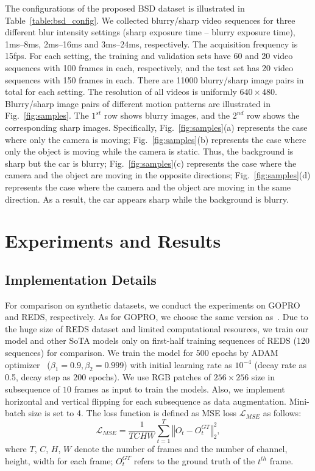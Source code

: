 \documentclass[twocolumn]{svjour3}          \smartqed  \usepackage{graphicx}
\begin{document}
The configurations of the proposed BSD dataset is illustrated in Table~\ref{table:bsd_config}. We collected blurry/sharp video sequences for three different blur intensity settings (sharp exposure time -- blurry exposure time), 1ms--8ms, 2ms--16ms and 3ms--24ms, respectively. The acquisition frequency is 15fps. For each setting, the training and validation sets have 60 and 20 video sequences with 100 frames in each, respectively, and the test set has 20 video sequences with 150 frames in each. There are 11000 blurry/sharp image pairs in total for each setting. The resolution of all videos is uniformly $640\times480$. Blurry/sharp image pairs of different motion patterns are illustrated in Fig.~\ref{fig:samples}. The $1^{st}$ row shows blurry images, and the $2^{nd}$ row shows the corresponding sharp images. Specifically, Fig.~\ref{fig:samples}(a) represents the case where only the camera is moving; Fig.~\ref{fig:samples}(b) represents the case where only the object is moving while the camera is static. Thus, the background is sharp but the car is blurry; Fig.~\ref{fig:samples}(c) represents the case where the camera and the object are moving in the opposite directions; Fig.~\ref{fig:samples}(d) represents the case where the camera and the object are moving in the same direction. As a result, the car appears sharp while the background is blurry.

\section{Experiments and Results}
\subsection{Implementation Details}

For comparison on synthetic datasets, we conduct the experiments on GOPRO and REDS, respectively. As for GOPRO, we choose the same version as~\cite{nah2019recurrent}. Due to the huge size of REDS dataset and limited computational resources, we train our model and other SoTA models only on first-half training sequences of REDS (120 sequences) for comparison. We train the model for 500 epochs by ADAM optimizer~\cite{kingma2014adam} ($\beta_1=0.9, \beta_2=0.999$) with initial learning rate as $10^{-4}$ (decay rate as 0.5, decay step as 200 epochs). We use RGB patches of $256\times256$ size in subsequence of $10$ frames as input to train the models. Also, we implement horizontal and vertical flipping for each subsequence as data augmentation. Mini-batch size is set to 4. The loss function is defined as MSE loss $\mathcal{L}_{MSE}$ as follows:
\begin{equation}
    \mathcal{L}_{MSE} = \frac{1}{TCHW}\sum_{t=1}^{T} \left\Vert O_t - O_t^{GT} \right\Vert_{2}^{2},
\end{equation}
where $T$, $C$, $H$, $W$ denote the number of frames and the number of channel, height, width for each frame; $O_t^{GT}$ refers to the ground truth of the $t^{th}$ frame.
\end{document}
